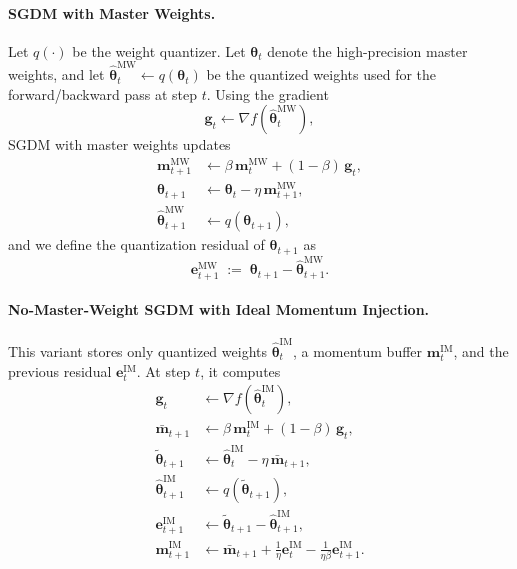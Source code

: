 \documentclass[11pt, a4paper, onecolumn, copyright, goog]{google}
\newcommand{\vect}[1]{\mathbf{#1}}
\newcommand{\vtheta}{\boldsymbol{\theta}}
\newcommand{\vg}{\vect{g}}
\newcommand{\vm}{\vect{m}}
\newcommand{\ve}{\vect{e}}
\newcommand{\qfn}{\textit{q}}
\theoremstyle{plain}
\theoremstyle{definition}
\theoremstyle{remark}
\begin{document}
\paragraph{SGDM with Master Weights.}
Let $\qfn(\cdot)$ be the weight quantizer. Let $\vtheta_t$ denote the high-precision master weights, and let
$\hat{\vtheta}^{\text{MW}}_t \leftarrow \qfn(\vtheta_t)$
be the quantized weights used for the forward/backward pass at step $t$.
Using the gradient
\begin{equation}
\vg_t \leftarrow \nabla f(\hat{\vtheta}^{\text{MW}}_t),
\label{eq:mw_grad}
\end{equation}
SGDM with master weights updates
\begin{align}
\vm^{\text{MW}}_{t+1} &\leftarrow \beta\,\vm^{\text{MW}}_t + (1-\beta)\,\vg_t,
\label{eq:mw_mom}\\
\vtheta_{t+1} &\leftarrow \vtheta_t - \eta\,\vm^{\text{MW}}_{t+1},
\label{eq:mw_theta}\\
\hat{\vtheta}^{\text{MW}}_{t+1} &\leftarrow \qfn(\vtheta_{t+1}),
\label{eq:mw_quant}
\end{align}
and we define the quantization residual of $\vtheta_{t+1}$ as
\begin{equation}
\ve^{\text{MW}}_{t+1} \;:=\; \vtheta_{t+1} - \hat{\vtheta}^{\text{MW}}_{t+1}.
\label{eq:mw_err}
\end{equation}

\paragraph{No-Master-Weight SGDM with Ideal Momentum Injection.}
This variant stores only quantized weights $\hat{\vtheta}^{\text{IM}}_t$, a momentum buffer $\vm^{\text{IM}}_t$, and the previous residual $\ve^{\text{IM}}_t$. At step $t$, it computes
\begin{align}
\vg_t &\leftarrow \nabla f(\hat{\vtheta}^{\text{IM}}_t), \nonumber\\
\bar{\vm}_{t+1} &\leftarrow \beta\,\vm^{\text{IM}}_t + (1-\beta)\,\vg_t, \label{eq:im_bar_m}\\
\tilde{\vtheta}_{t+1} &\leftarrow \hat{\vtheta}^{\text{IM}}_t - \eta\,\bar{\vm}_{t+1}, \label{eq:im_tilde_theta}\\
\hat{\vtheta}^{\text{IM}}_{t+1} &\leftarrow \qfn(\tilde{\vtheta}_{t+1}), \label{eq:im_quant}\\
\ve^{\text{IM}}_{t+1} &\leftarrow \tilde{\vtheta}_{t+1} - \hat{\vtheta}^{\text{IM}}_{t+1}, \label{eq:im_err}\\
\vm^{\text{IM}}_{t+1} &\leftarrow \bar{\vm}_{t+1} + \frac{1}{\eta}\ve^{\text{IM}}_{t} - \frac{1}{\eta\beta}\ve^{\text{IM}}_{t+1}. \label{eq:im_inject}
\end{align}
\end{document}
